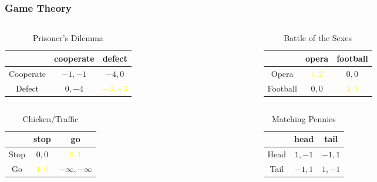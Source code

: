 \documentclass[UTF8,11pt,colorlinks,compress,openany]{beamer}%
\begin{document}
\begin{frame}\frametitle{Game Theory}
\begin{columns}
\begin{table}
\begin{tabu}{c|cc}
\hline
 & cooperate & defect\\
\hline
Cooperate & $-1,-1$ & $-4,0$\\
Defect & $0,-4$ &\textcolor{yellow}{$-3,-3$}\\
\hline
\end{tabu}\caption{Prisoner's Dilemma}
\end{table}
\begin{table}
\begin{tabu}{c|cc}
\hline
 & opera & football\\
\hline
Opera & \textcolor{yellow}{$1,2$} & $0,0$\\
Football & $0,0$ & \textcolor{yellow}{$2,1$}\\
\hline
\end{tabu}\caption{Battle of the Sexes}
\end{table}
\end{columns}
\begin{columns}
\begin{table}
\begin{tabu}{c|cc}
\hline
 & stop & go\\
\hline
Stop & $0,0$ & \textcolor{yellow}{$0,1$}\\
Go & \textcolor{yellow}{$1,0$} & $-\infty,-\infty$\\
\hline
\end{tabu}
\caption{\footnotesize Chicken/Traffic}
\end{table}
\begin{table}
\begin{tabu}{c|cc}
\hline
 & head & tail\\
\hline
Head & $1,-1$ & $-1,1$\\
Tail & $-1,1$ & $1,-1$\\
\hline
\end{tabu}\caption{Matching Pennies}
\end{table}
\end{columns}
\end{frame}
\end{document}
